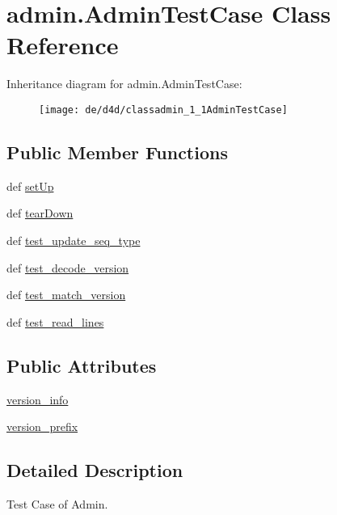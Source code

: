 \hypertarget{classadmin_1_1AdminTestCase}{\section{admin.\-Admin\-Test\-Case Class Reference}
\label{classadmin_1_1AdminTestCase}
}
Inheritance diagram for admin.\-Admin\-Test\-Case\-:\begin{figure}[H]
\begin{center}
\leavevmode
\texttt{[image: de/d4d/classadmin\_1\_1AdminTestCase]}
\end{center}
\end{figure}
\subsection*{Public Member Functions}
\begin{DoxyCompactItemize}
\item 
def \hyperlink{classadmin_1_1AdminTestCase_aca4bb6a593abafd54beab84d0bbdc022}{set\-Up}
\item 
def \hyperlink{classadmin_1_1AdminTestCase_af75fd183f956c48df406d47885d97d7d}{tear\-Down}
\item 
def \hyperlink{classadmin_1_1AdminTestCase_a709452e65fce450953b25bdf40fcc732}{test\-\_\-update\-\_\-seq\-\_\-type}
\item 
def \hyperlink{classadmin_1_1AdminTestCase_a85c52730e0f3491e3b2866404859c6e3}{test\-\_\-decode\-\_\-version}
\item 
def \hyperlink{classadmin_1_1AdminTestCase_a7b416cbb45f1f3a5caaa786979ad0e30}{test\-\_\-match\-\_\-version}
\item 
def \hyperlink{classadmin_1_1AdminTestCase_aeec54ed9163aff1e0615764d4ff2f319}{test\-\_\-read\-\_\-lines}
\end{DoxyCompactItemize}
\subsection*{Public Attributes}
\begin{DoxyCompactItemize}
\item 
\hyperlink{classadmin_1_1AdminTestCase_a235ad774d40bba3600cf09b79dc9f209}{version\-\_\-info}
\item 
\hyperlink{classadmin_1_1AdminTestCase_a6b12aab33be61651698f4b8810678168}{version\-\_\-prefix}
\end{DoxyCompactItemize}


\subsection{Detailed Description}
\begin{DoxyVerb}Test Case of Admin.
\end{DoxyVerb}
 

